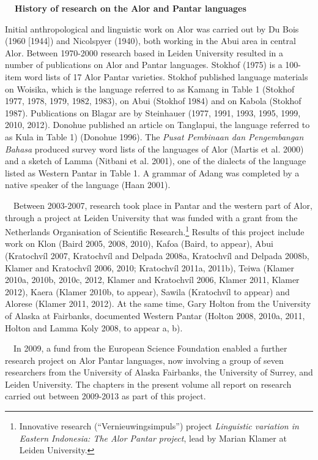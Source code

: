 {\bfseries
\ \ History of research on the Alor and Pantar languages}

Initial anthropological and linguistic work on Alor was carried out by Du Bois (1960 [1944]) and Nicolspyer (1940), both working in the Abui area in central Alor. Between 1970-2000 research based in Leiden University resulted in a number of publications on Alor and Pantar languages. Stokhof (1975) is a 100-item word lists of 17 Alor Pantar varieties. Stokhof published language materials on Woisika, which is the language referred to as Kamang in Table 1 (Stokhof 1977, 1978, 1979, 1982, 1983), on Abui (Stokhof 1984) and on Kabola (Stokhof 1987). Publications on Blagar are by Steinhauer (1977, 1991, 1993, 1995, 1999, 2010, 2012). Donohue published an article on Tanglapui, the language referred to as Kula in Table 1) (Donohue 1996). The \textit{Pusat Pembinaan dan Pengembangan Bahasa} produced survey word lists of the languages of Alor (Martis et al. 2000) and a sketch of Lamma (Nitbani et al. 2001), one of the dialects of the language listed as Western Pantar in  Table 1. A grammar of Adang was completed by a 
native speaker of the language (Haan 2001). 

\ \ Between 2003-2007, research took place in Pantar and the western part of Alor, through a project at Leiden University that was funded with a grant from the Netherlands Organisation of Scientific Research.\footnote{Innovative research ({\textquotedblleft}Vernieuwingsimpuls{\textquotedblright}) project \textit{Linguistic variation in Eastern Indonesia: The Alor Pantar project}, lead by Marian Klamer at Leiden University.} Results of this project include work on Klon (Baird 2005, 2008, 2010), Kafoa (Baird, to appear), Abui (Kratochv\'il 2007, Kratochv\'il and Delpada 2008a, Kratochv\'il and Delpada 2008b, Klamer and Kratochv\'il 2006, 2010; Kratochv\'il 2011a, 2011b), Teiwa (Klamer 2010a, 2010b, 2010c, 2012, Klamer and Kratochv\'il 2006, Klamer 2011, Klamer 2012), Kaera (Klamer 2010b, to appear), Sawila (Kratochv\'il to appear) and Alorese (Klamer 2011, 2012). At the same time, Gary Holton from the University of Alaska at Fairbanks, documented Western Pantar (Holton 2008, 2010a, 2011, Holton and Lamma Koly 
2008, to appear a, b). 

\ \ In 2009, a fund from the European Science Foundation enabled a further research project on Alor Pantar languages, now involving a group of seven researchers from the University of Alaska Fairbanks, the University of Surrey, and Leiden University. The chapters in the present volume all report on research carried out between 2009-2013 as part of  this project.

